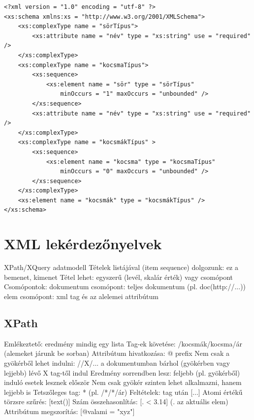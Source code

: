\documentclass[12pt,a4paper]{article}
\begin{document}
\begin{verbatim}
<?xml version = "1.0" encoding = "utf-8" ?>
<xs:schema xmlns:xs = "http://www.w3.org/2001/XMLSchema">
    <xs:complexType name = "sörTípus">
        <xs:attribute name = "név" type = "xs:string" use = "required" />
    </xs:complexType>
    <xs:complexType name = "kocsmaTípus">
        <xs:sequence>
            <xs:element name = "sör" type = "sörTípus"
                minOccurs = "1" maxOccurs = "unbounded" />
        </xs:sequence>
        <xs:attribute name = "név" type = "xs:string" use = "required" />
    </xs:complexType>
    <xs:complexType name = "kocsmákTípus" >
        <xs:sequence>
            <xs:element name = "kocsma" type = "kocsmaTípus"
                minOccurs = "0" maxOccurs = "unbounded" />
        </xs:sequence>
    </xs:complexType>
    <xs:element name = "kocsmák" type = "kocsmákTípus" />
</xs:schema>
\end{verbatim}

\pagebreak

\section{XML lekérdezőnyelvek}

\begin{outline}
	\1 XPath/XQuery adatmodell
		\2 Tételek listájával (item sequence) dolgozunk: ez a bemenet, kimenet
		\2 Tétel lehet: egyszerű (levél, skalár érték) vagy csomópont
	\1 Csomópontok:
		\2 dokumentum csomópont: teljes dokumentum (pl. doc(http://...))
		\2 elem csomópont: xml tag és az alelemei
		\2 attribútum
\end{outline}

\subsection{XPath}

\begin{outline}
	\1 Emlékeztető: eredmény mindig egy lista
	\1 Tag-ek követése: /kocsmák/kocsma/ár (alemeket járunk be sorban)
	\1 Attribútum hivatkozása: @ prefix
	\1 Nem csak a gyökérből lehet indulni:
		\2 //X/... a dokumentumban bárhol (gyökérben vagy lejjebb) lévő X tag-től indul
		\2 Eredmény sorrendben lesz: feljebb (pl. gyökérből) induló esetek lesznek először
		\2 Nem csak gyökér szinten lehet alkalmazni, hanem lejjebb is
	\1 Tetszőleges tag: * (pl. /*/*/ár)
	\1 Feltételek: tag után [...]
		\2 Atomi értékű törzsre szűrés: [text()]
		\2 Szám összehasonlítás: [. < 3.14] \;\; (. az aktuális elem)
		\2 Attribútum megszorítás: [@valami = "xyz"]
\end{outline}
\end{document}
